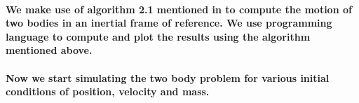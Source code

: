 \paragraph{We make use of algorithm 2.1 mentioned in \textcite{orbital_mechanics_4ed} to compute the motion of two bodies in an inertial frame of reference. We use \textcite{python_org} programming language to compute and plot the results using the algorithm mentioned above.}

\paragraph{Now we start simulating the two body problem for various initial conditions of position, velocity and mass.}
